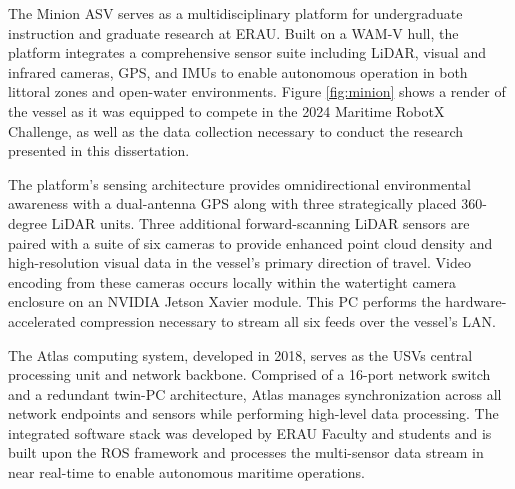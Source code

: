 \documentclass{erauthesis}
\begin{document}

The Minion \Ac{ASV} serves as a multidisciplinary platform for undergraduate instruction and graduate research at \ac{ERAU}.
Built on a \ac{WAM-V} hull, the platform integrates a comprehensive sensor suite including \ac{LiDAR}, visual and infrared cameras, \ac{GPS}, and \acp{IMU} to enable autonomous operation in both littoral zones and open-water environments.
Figure \ref{fig:minion} shows a render of the vessel as it was equipped to compete in the 2024 Maritime RobotX Challenge, as well as the data collection necessary to conduct the research presented in this dissertation.

The platform's sensing architecture provides omnidirectional environmental awareness with a dual-antenna \ac{GPS} along with three strategically placed 360-degree \ac{LiDAR} units.
Three additional forward-scanning \ac{LiDAR} sensors are paired with a suite of six cameras to provide enhanced point cloud density and high-resolution visual data in the vessel's primary direction of travel. 
Video encoding from these cameras occurs locally within the watertight camera enclosure on an NVIDIA Jetson Xavier module.
This PC performs the hardware-accelerated compression necessary to stream all six feeds over the vessel's \ac{LAN}.

The Atlas computing system, developed in 2018, serves as the \acp{USV} central processing unit and network backbone.
Comprised of a 16-port network switch and a redundant twin-PC architecture, Atlas manages synchronization across all network endpoints and sensors while performing high-level data processing.
The integrated software stack was developed by \ac{ERAU} Faculty and students and is built upon the \ac{ROS} framework and processes the multi-sensor data stream in near real-time to enable autonomous maritime operations.
\end{document}
